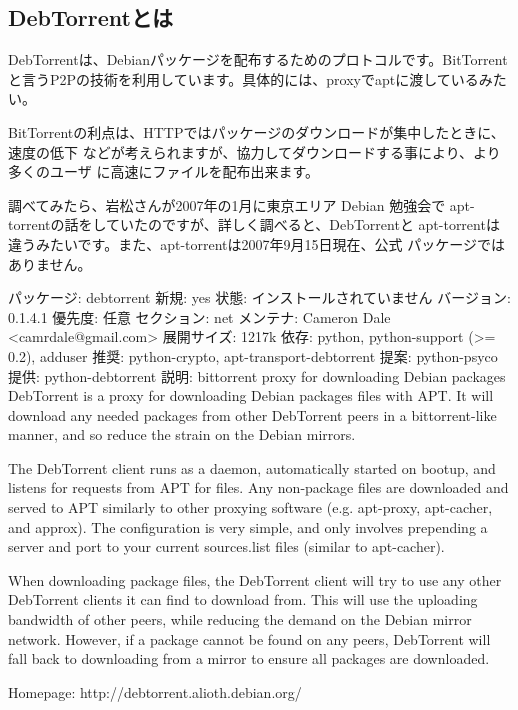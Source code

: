\documentclass[mingoth,a4paper]{jsarticle}
\begin{document}
\subsection{DebTorrentとは}
DebTorrentは、Debianパッケージを配布するためのプロトコルです。BitTorrent
と言うP2Pの技術を利用しています。具体的には、proxyでaptに渡しているみた
い。

BitTorrentの利点は、HTTPではパッケージのダウンロードが集中したときに、速度の低下
などが考えられますが、協力してダウンロードする事により、より多くのユーザ
に高速にファイルを配布出来ます。

調べてみたら、岩松さんが2007年の1月に東京エリア Debian 勉強会で
apt-torrentの話をしていたのですが、詳しく調べると、DebTorrentと
apt-torrentは違うみたいです。また、apt-torrentは2007年9月15日現在、公式
パッケージではありません。

\begin{commandline}
パッケージ: debtorrent
新規: yes
状態: インストールされていません
バージョン: 0.1.4.1
優先度: 任意
セクション: net
メンテナ: Cameron Dale <camrdale@gmail.com>
展開サイズ: 1217k
依存: python, python-support (>= 0.2), adduser
推奨: python-crypto, apt-transport-debtorrent
提案: python-psyco
提供: python-debtorrent
説明: bittorrent proxy for downloading Debian packages
 DebTorrent is a proxy for downloading Debian packages files with APT. It will
 download any needed packages from other DebTorrent peers in a bittorrent-like
 manner, and so reduce the strain on the Debian mirrors. 
 
 The DebTorrent client runs as a daemon, automatically started on bootup, and
 listens for requests from APT for files. Any non-package files are downloaded
 and served to APT similarly to other proxying software (e.g. apt-proxy,
 apt-cacher, and approx). The configuration is very simple, and only involves
 prepending a server and port to your current sources.list files (similar to
 apt-cacher). 
 
 When downloading package files, the DebTorrent client will try to use any other
 DebTorrent clients it can find to download from. This will use the uploading
 bandwidth of other peers, while reducing the demand on the Debian mirror
 network. However, if a package cannot be found on any peers, DebTorrent will
 fall back to downloading from a mirror to ensure all packages are downloaded. 
 
 Homepage: http://debtorrent.alioth.debian.org/
\end{commandline}
\end{document}
